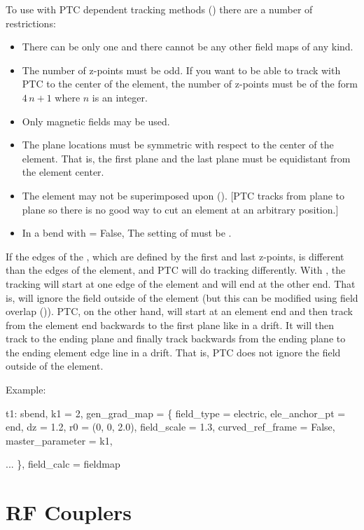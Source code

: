 To use with PTC dependent tracking methods () there are a number of
restrictions: 
  \begin{itemize}
  \item
There can be only one  and there cannot be any other field maps of any kind.
  \item 
The number of z-points must be odd. If you want to be able to track with PTC to the center of the
element, the number of z-points must be of the form $4 \, n + 1$ where $n$ is an integer.
  \item
Only magnetic fields may be used.
  \item
The plane locations must be symmetric with respect to the center of the element. That is,
the first plane and the last plane must be equidistant from the element center.
  \item
The element may not be superimposed upon (). [PTC tracks from plane to plane
so there is no good way to cut an element at an arbitrary position.]
  \item
In a bend with  = False, The setting of  must be
.
  \end{itemize}
If the edges of the , which are defined by the first and last z-points, is different
than the edges of the element, \bmad and PTC will do tracking differently. With \bmad, the tracking
will start at one edge of the element and will end at the other end. That is, \bmad will ignore the
field outside of the element (but this can be modified using field overlap ()). PTC,
on the other hand, will start at an element end and then track from the element end backwards to the
first plane like in a drift. It will then track to the ending plane and finally track backwards from
the ending plane to the ending element edge line in a drift. That is, PTC does not ignore the field
outside of the element.

Example:
\begin{example}
  t1: sbend, k1 = 2, gen_grad_map = \{
    field_type = electric,   ele_anchor_pt = end, 
    dz = 1.2,                r0 = (0, 0, 2.0),
    field_scale = 1.3,       curved_ref_frame = False,
    master_parameter = k1,

    ...  \}, field_calc = fieldmap
\end{example}

\section{RF Couplers}
\label{s:rf.coupler}

